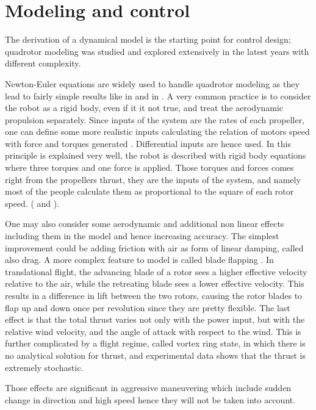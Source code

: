\section{Modeling and control}

The derivation of a dynamical model is the starting point for control design; quadrotor modeling was studied and explored extensively in the latest years with different complexity.\par Newton-Euler equations are widely used to handle quadrotor modeling as they lead to fairly simple results like in \cite{Michael2014}  and in \cite{Vendittelli}. A very common practice is to consider the robot as a rigid body, even if it it not true, and treat the aerodynamic propulsion separately. Since inputs of the system are the rates of each propeller, one can define some more realistic inputs calculating the relation of motors speed with force and torques generated \cite{Luukkonen2011}. Differential inputs are hence used. In \cite{Mahony2012} this principle is explained very well, the robot is described with rigid body equations where three torques and one force is applied. Those torques and forces comes right from the propellers thrust, they are the inputs of the system, and namely most of the people calculate them as proportional to the square of each rotor speed. (\cite{Bouabdallah2007} and \cite{Mahony2012}). \par One may also consider some aerodynamic and additional non linear effects including them in the model and hence increasing accuracy. The simplest improvement could be adding friction with air as form of linear damping, called also drag. A more complex feature to model is called blade flapping \cite{Mahony2012}. In translational flight, the advancing blade of a rotor sees a higher effective velocity relative to the air, while the retreating blade sees a lower effective velocity. This results in a difference in lift between the two rotors, causing the rotor blades to flap up and down once per revolution \cite{Hoffmann2007} since they are pretty flexible. The last effect is that the total thrust varies not only with the power input, but with the relative wind velocity, and the angle of attack with respect to the wind. This is further complicated by a flight regime, called vortex ring state, in which there is no analytical solution for thrust, and experimental data shows that the thrust is extremely stochastic. \par Those effects are significant in aggressive maneuvering which include sudden change in direction and high speed hence they will not be taken into account. \\

